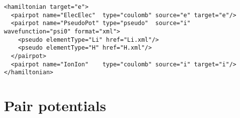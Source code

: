\begin{lstlisting}[caption=Pseudopotential Hamiltonian XML element.]
<hamiltonian target="e">
  <pairpot name="ElecElec"  type="coulomb" source="e" target="e"/>
  <pairpot name="PseudoPot" type="pseudo"  source="i" wavefunction="psi0" format="xml">
    <pseudo elementType="Li" href="Li.xml"/>
    <pseudo elementType="H" href="H.xml"/>
  </pairpot>
  <pairpot name="IonIon"    type="coulomb" source="i" target="i"/>
</hamiltonian>
\end{lstlisting}


\section{Pair potentials}

\FloatBarrier
